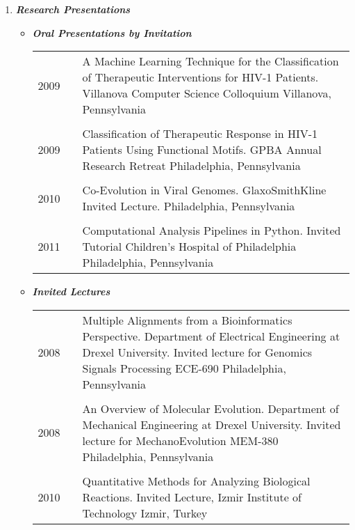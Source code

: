 \documentclass[a4paper,11pt]{article}
\begin{document}
\begin{enumerate}
\begin{itemize}
 \end{itemize}

 \item {\LARGE \itshape \bfseries Research Presentations}
 \begin{itemize}
  \item[] {\Large \bfseries \itshape Oral Presentations by Invitation}
   \begin{longtable}{p{}p{}p{}}
  2009 & & A Machine Learning Technique for the Classification of Therapeutic Interventions for HIV-1 Patients. \newline Villanova Computer Science Colloquium \newline Villanova, Pennsylvania \\
  \\
  2009 & & Classification of Therapeutic Response in HIV-1 Patients Using Functional Motifs. \newline GPBA Annual Research Retreat \newline Philadelphia, Pennsylvania \\
  \\
  2010 & & Co-Evolution in Viral Genomes. \newline GlaxoSmithKline Invited Lecture. \newline 	Philadelphia, Pennsylvania \\
  \\
  2011 & & Computational Analysis Pipelines in Python. \newline Invited Tutorial Children’s Hospital of Philadelphia \newline Philadelphia, Pennsylvania \\
  \end{longtable}
  \item[] {\Large \bfseries \itshape Invited Lectures}
   \begin{longtable}{p{}p{}p{}}
   2008 & & Multiple Alignments from a Bioinformatics Perspective. \newline Department of Electrical Engineering at Drexel University. \newline Invited lecture for Genomics Signals Processing ECE-690 \newline 	Philadelphia, Pennsylvania \\
   \\
   2008 & & An Overview of Molecular Evolution. \newline Department of Mechanical Engineering at Drexel University. \newline Invited lecture for MechanoEvolution MEM-380 \newline Philadelphia, Pennsylvania \\
   \\
   2010 & & Quantitative Methods for Analyzing Biological Reactions. \newline Invited Lecture, Izmir Institute of Technology \newline Izmir, Turkey \\
  \end{longtable}
 \end{itemize} 
\end{enumerate}
\end{document}
